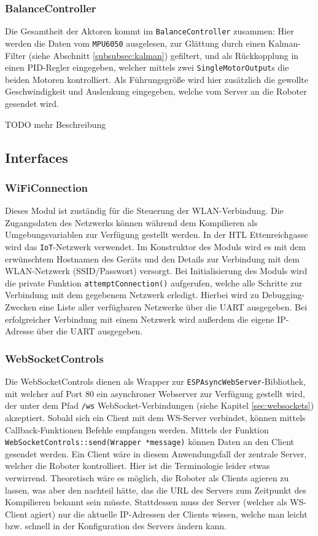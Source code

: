 \subsubsection{BalanceController}
Die Gesamtheit der Aktoren kommt im \texttt{BalanceController} zusammen:
Hier werden die Daten vom \texttt{MPU6050} ausgelesen,
zur Glättung durch einen Kalman-Filter (siehe Abschnitt \ref{subsubsec:kalman}) gefiltert,
und als Rückkopplung in einen PID-Regler eingegeben,
welcher mittels zwei \texttt{SingleMotorOutput}s die beiden Motoren kontrolliert.
%
Als Führungsgröße wird hier zusätzlich die gewollte Geschwindigkeit und Auslenkung eingegeben,
welche vom Server an die Roboter gesendet wird.

TODO mehr Beschreibung 

\subsection{Interfaces}
\subsubsection{WiFiConnection}
Dieses Modul ist zuständig für die Steuerung der WLAN-Verbindung.
%
Die Zugangsdaten des Netzwerks können während dem Kompilieren
als Umgebungsvariablen zur Verfügung gestellt werden.
%
In der HTL Ettenreichgasse wird das \texttt{IoT}-Netzwerk verwendet.
%
Im Konstruktor des Moduls wird es mit dem erwünschtem Hostnamen des Geräts
und den Details zur Verbindung mit dem WLAN-Netzwerk (SSID/Passwort) versorgt.
%
Bei Initialisierung des Moduls wird die private Funktion \texttt{attemptConnection()} aufgerufen,
welche alle Schritte zur Verbindung mit dem gegebenem Netzwerk erledigt.
%
Hierbei wird zu Debugging-Zwecken eine Liste aller verfügbaren Netzwerke über die UART ausgegeben.
%
Bei erfolgreicher Verbindung mit einem Netzwerk wird außerdem die eigene IP-Adresse über die UART ausgegeben. 

\subsubsection{WebSocketControls}
Die WebSocketControls dienen als Wrapper zur \texttt{ESPAsyncWebServer}-Bibliothek,
mit welcher auf Port 80 ein asynchroner Webserver zur Verfügung gestellt wird,
der unter dem Pfad \texttt{/ws} WebSocket-Verbindungen (siehe Kapitel \ref{sec:websockets}) akzeptiert.
%
Sobald sich ein Client mit dem WS-Server verbindet,
können mittels Callback-Funktionen Befehle empfangen werden.
%
Mittels der Funktion \texttt{WebSocketControls::send(Wrapper *message)} können Daten an den Client gesendet werden.
%
Ein Client wäre in diesem Anwendungsfall der zentrale Server,
welcher die Roboter kontrolliert.
%
Hier ist die Terminologie leider etwas verwirrend.
%
Theoretisch wäre es möglich,
die Roboter als Clients agieren zu lassen,
was aber den nachteil hätte,
das die URL des Servers zum Zeitpunkt des Kompilieren bekannt sein müsste.
%
Stattdessen muss der Server (welcher als WS-Client agiert) nur die aktuelle IP-Adressen der Clients wissen,
welche man leicht bzw. schnell in der Konfiguration des Servers ändern kann.

